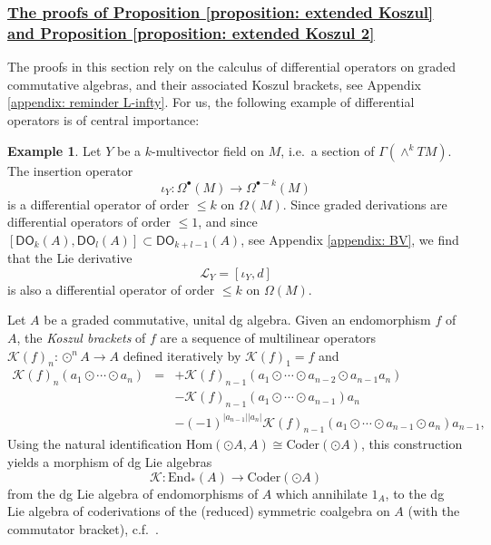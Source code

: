 \documentclass[11pt,thmsa]{amsart}
\theoremstyle{definition}
\newtheorem{example}[theorem]{Example}
\newcommand{\Hom}{\mathrm{Hom}}
\newcommand{\Lie}{\mathcal{L}}
\newcommand{\Diffop}{\mathsf{DO}}
\newcommand{\Koszul}{\mathcal{K}}
\newcommand{\Coder}{\mathrm{Coder}}
\begin{document}
{\subsubsection{\underline{The proofs of Proposition \ref{proposition: extended Koszul} and Proposition \ref{proposition: extended Koszul 2}}}
\label{subsubsection: proofs of extended Koszul 1 and 2}
 
The proofs in this section rely on the calculus of differential operators on graded commutative algebras, and their associated Koszul brackets, see Appendix \ref{appendix: reminder L-infty}.
For us, the following example of differential operators is of central importance:

\begin{example}
Let $Y$ be a $k$-multivector field on $M$, i.e.~a section of $\Gamma(\wedge^k TM)$.
The insertion operator
$$ \iota_Y: \Omega^\bullet(M) \to \Omega^{\bullet-k}(M)$$
is a differential operator of order $\le k$ on $\Omega(M)$.
Since graded derivations are differential operators of order $\le 1$,
and since $[\Diffop_k(A),\Diffop_l(A)]\subset \Diffop_{k+l-1}(A)$, see Appendix \ref{appendix: BV},
we find that the Lie derivative
$$\Lie_Y = [\iota_Y,d]$$
is also a differential operator of order $\le k$ on $\Omega(M)$.
\end{example}

Let $A$ be a graded commutative, unital dg algebra.
Given an endomorphism $f$ of $A$, the {\em Koszul brackets} of $f$ are 
a sequence of multilinear operators
$\Koszul(f)_n: \odot^n A\to A$ defined iteratively by
$\Koszul(f)_1=f$ and
\begin{eqnarray*}
\Koszul(f)_n(a_1\odot \cdots \odot a_n) &=& +\Koszul(f)_{n-1}(a_1\odot \cdots \odot a_{n-2}\odot a_{n-1}a_n)\\
&& - \Koszul(f)_{n-1}(a_1\odot \cdots \odot a_{n-1})a_n\\
&&-(-1)^{|a_{n-1}||a_n|}\Koszul(f)_{n-1}(a_1\odot \cdots \odot a_{n-1}\odot a_n)a_{n-1},
\end{eqnarray*}
Using the natural identification $\Hom(\odot A,A)\cong \Coder(\odot A)$, this construction yields a morphism of dg Lie algebras
\begin{equation}\label{eq:cK}
 \Koszul: \mathrm{End}_*(A) \to \Coder(\odot A)
\end{equation}
from the dg Lie algebra of endomorphisms of $A$ which annihilate $1_A$, to the dg Lie algebra of coderivations
of the (reduced) symmetric coalgebra on $A$ (with the commutator bracket),
c.f.~\cite{Voronov1}.




}
\end{document}
